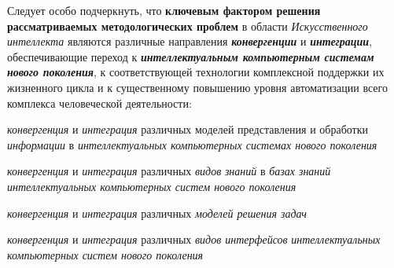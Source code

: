 Следует особо подчеркнуть, что \textbf{ключевым фактором решения рассматриваемых методологических проблем} в области \textit{Искусственного интеллекта} являются различные направления \textbf{\textit{конвергенции}} и \textbf{\textit{интеграции}}, обеспечивающие переход к \textbf{\textit{интеллектуальным компьютерным системам нового поколения}}, к соответствующей технологии комплексной поддержки их жизненного цикла и к существенному повышению уровня автоматизации всего комплекса человеческой деятельности:

\begin{textitemize}
	\item
	\textit{конвергенция} и \textit{интеграция} различных моделей представления и обработки \textit{информации} в \textit{интеллектуальных компьютерных системах нового поколения}
	
	\begin{textitemize}
		\item \textit{конвергенция} и \textit{интеграция} различных \textit{видов} \textit{знаний} в \textit{базах знаний} \textit{интеллектуальных компьютерных систем нового поколения}
		
		\item \textit{конвергенция} и \textit{интеграция} различных \textit{моделей решения задач}
		
		\item \textit{конвергенция} и \textit{интеграция} различных \textit{видов интерфейсов} \textit{интеллектуальных компьютерных систем нового поколения}
	\end{textitemize}
	

\end{textitemize}
